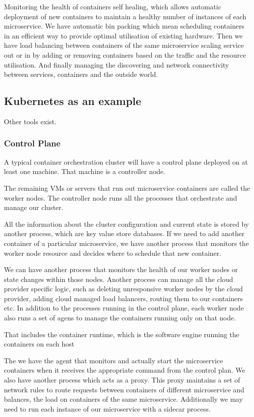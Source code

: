 Monitoring the health of containers self healing, which allows automatic deployment of new containers to maintain a healthy number of instances of each microservice.
We have automatic bin packing which mean scheduling containers in an efficient way to provide optimal utilisation of existing hardware.
Then we have load balancing between containers of the same microservice scaling service out or in by adding or removing containers based on the traffic and the resource utilisation.
And finally managing the discovering and network connectivity between services, containers and the outside world.

\subsection{Kubernetes as an example}
Other tools exist.

\subsubsection{Control Plane}
A typical container orchestration cluster will have a control plane deployed on at least one machine.
That machine is a controller node.

The remaining VMs or servers that run out microservice containers are called the worker nodes.
The controller node runs all the processes that orchestrate and manage our cluster.

All the information about the cluster configuration and current state is stored by another process, which are key value store databases.
If we need to add another container of a particular microservice, we have another process that monitors the worker node resource and decides where to schedule that new container.

We can have another process that monitors the health of our worker nodes or state changes within those nodes.
Another process can manage all the cloud provider specific logic, such as deleting unresponsive worker nodes by the cloud provider, adding cloud managed load balancers, routing them to our containers etc.
In addition to the processes running in the control plane, each worker node also runs a set of agens to manage the containers running only on that node.

That includes the container runtime, which is the software engine running the containers on each host

The we have the agent that monitors and actually start the microservice containers when it receives the appropriate command from the control plan.
We also have another process which acts as a proxy.
This proxy maintains a set of network rules to route requests between containers of different microservice and balances, the load on containers of the same microservice.
Additionally we may need to run each instance of our microservice with a sidecar process.

